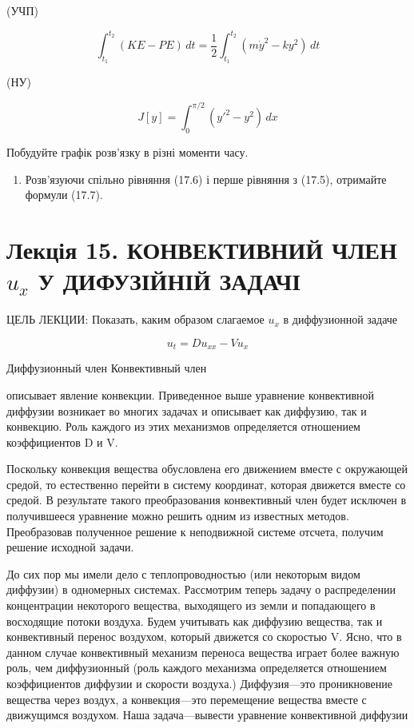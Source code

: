 \documentclass[
  ukrainian,
]{article}
\providecommand{\tightlist}{%
  \setlength{\itemsep}{0pt}\setlength{\parskip}{0pt}}
\begin{document}
(УЧП)

\[
\int_{t_{1}}^{t_{2}} (KE - PE)\,dt = \frac{1}{2} \int_{t_{1}}^{t_{2}} (m\dot{y}^{2} - ky^{2})\,dt
\]

(НУ)

\[
J[y] = \int_{0}^{\pi/2} (y'^{2} - y^{2})\,dx
\]

Побудуйте графік розв'язку в різні моменти часу.

\begin{enumerate}
\def\labelenumi{\arabic{enumi}.}
\setcounter{enumi}{4}
\tightlist
\item
  Розв'язуючи спільно рівняння (17.6) і перше рівняння з (17.5),
  отримайте формули (17.7).
\end{enumerate}

\section{\texorpdfstring{Лекція 15. КОНВЕКТИВНИЙ ЧЛЕН \(u_x\) У
ДИФУЗІЙНІЙ
ЗАДАЧІ}{Лекція 15. КОНВЕКТИВНИЙ ЧЛЕН u\_x У ДИФУЗІЙНІЙ ЗАДАЧІ}}\label{ux43bux435ux43aux446ux456ux44f-15.-ux43aux43eux43dux432ux435ux43aux442ux438ux432ux43dux438ux439-ux447ux43bux435ux43d-u_x-ux443-ux434ux438ux444ux443ux437ux456ux439ux43dux456ux439-ux437ux430ux434ux430ux447ux456}

ЦЕЛЬ ЛЕКЦИИ: Показать, каким образом слагаемое \(u_x\) в диффузионной
задаче

\[
u_t = Du_{xx} - Vu_x
\]

Диффузионный член Конвективный член

описывает явление конвекции. Приведенное выше уравнение конвективной
диффузии возникает во многих задачах и описывает как диффузию, так и
конвекцию. Роль каждого из этих механизмов определяется отношением
коэффициентов D и V.

Поскольку конвекция вещества обусловлена его движением вместе с
окружающей средой, то естественно перейти в систему координат, которая
движется вместе со средой. В результате такого преобразования
конвективный член будет исключен в получившееся уравнение можно решить
одним из известных методов. Преобразовав полученное решение к
неподвижной системе отсчета, получим решение исходной задачи.

До сих пор мы имели дело с теплопроводностью (или некоторым видом
диффузии) в одномерных системах. Рассмотрим теперь задачу о
распределении концентрации некоторого вещества, выходящего из земли и
попадающего в восходящие потоки воздуха. Будем учитывать как диффузию
вещества, так и конвективный перенос воздухом, который движется со
скоростью V. Ясно, что в данном случае конвективный механизм переноса
вещества играет более важную роль, чем диффузионный (роль каждого
механизма определяется отношением коэффициентов диффузии и скорости
воздуха.) Диффузия---это проникновение вещества через воздух, а
конвекция---это перемещение вещества вместе с движущимся воздухом. Наша
задача---вывести уравнение конвективной диффузии
\end{document}
